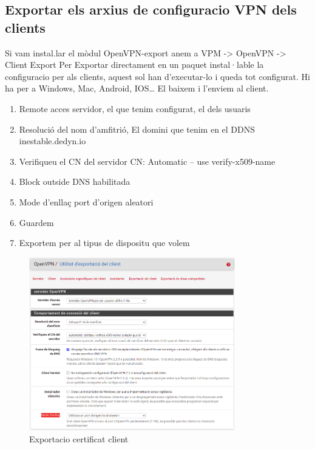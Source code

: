 \documentclass[
  10pt,
]{krantz}
\providecommand{\tightlist}{%
  \setlength{\itemsep}{0pt}\setlength{\parskip}{0pt}}
\begin{document}
\hypertarget{exportar-els-arxius-de-configuracio-vpn-dels-clients}{%
\subsection{Exportar els arxius de configuracio VPN dels clients}\label{exportar-els-arxius-de-configuracio-vpn-dels-clients}}

Si vam instal.lar el mòdul OpenVPN-export anem a VPM -\textgreater{} OpenVPN -\textgreater{} Client Export Per Exportar directament en un paquet instal·lable la configuracio per als clients, aquest sol han d'executar-lo i queda tot configurat. Hi ha per a Windows, Mac, Android, IOS\ldots{} El baixem i l'enviem al client.

\begin{enumerate}
\def\labelenumi{\arabic{enumi}.}
\tightlist
\item
  Remote acces servidor, el que tenim configurat, el dels usuaris
\item
  Resolució del nom d'amfitrió, El domini que tenim en el DDNS inestable.dedyn.io
\item
  Verifiqueu el CN del servidor CN: Automatic -- use verify-x509-name
\item
  Block outside DNS habilitada
\item
  Mode d'enllaç port d'origen aleatori
\item
  Guardem
\item
  Exportem per al tipus de dispositu que volem
\end{enumerate}

\begin{figure}
\centering
\includegraphics[width=0.8\textwidth,height=\textheight]{imatges/proxmox/Exporta_vpn_client1.png}
\caption{Exportacio certificat client}
\end{figure}
\end{document}
